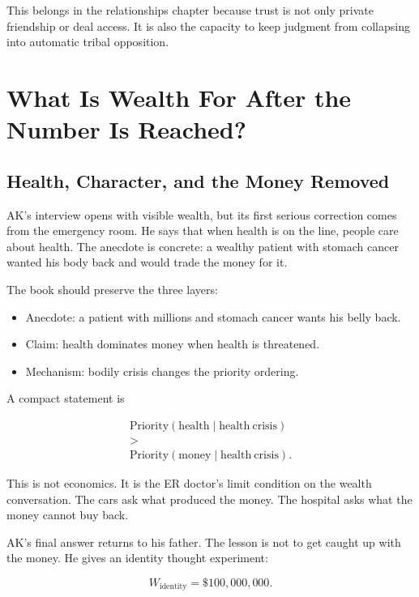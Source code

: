 \documentclass[11pt,oneside]{book}
\begin{document}
This belongs in the relationships chapter because trust is not only private friendship or deal access. It is also the capacity to keep judgment from collapsing into automatic tribal opposition.

\chapter{What Is Wealth For After the Number Is Reached?}

\section{Health, Character, and the Money Removed}

AK's interview opens with visible wealth, but its first serious correction comes from the emergency room. He says that when health is on the line, people care about health. The anecdote is concrete: a wealthy patient with stomach cancer wanted his body back and would trade the money for it.

The book should preserve the three layers:

\begin{itemize}
\item Anecdote: a patient with millions and stomach cancer wants his belly back.
\item Claim: health dominates money when health is threatened.
\item Mechanism: bodily crisis changes the priority ordering.
\end{itemize}

A compact statement is

\begin{equation}
\begin{gathered}
\mathrm{Priority}(\mathrm{health}\mid \mathrm{health\ crisis})\\
>\\
\mathrm{Priority}(\mathrm{money}\mid \mathrm{health\ crisis}).
\end{gathered}
\end{equation}

This is not economics. It is the ER doctor's limit condition on the wealth conversation. The cars ask what produced the money. The hospital asks what the money cannot buy back.

AK's final answer returns to his father. The lesson is not to get caught up with the money. He gives an identity thought experiment:

\begin{equation}
W_{\mathrm{identity}}=\$100{,}000{,}000.
\end{equation}
\end{document}
